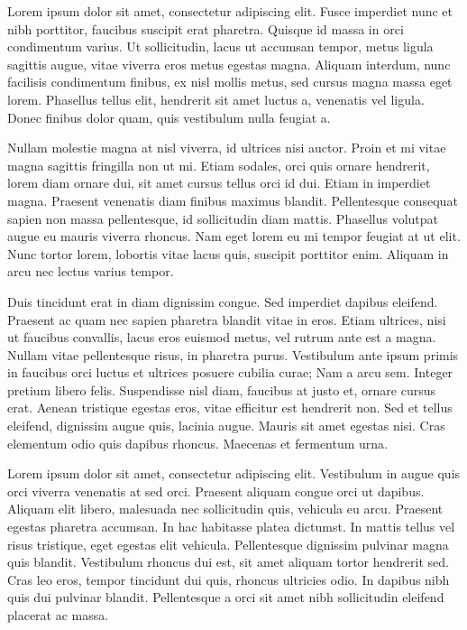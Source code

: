 \documentclass[onecolumn]{tome}
\begin{document}
Lorem ipsum dolor sit amet, consectetur adipiscing elit. Fusce imperdiet nunc et nibh porttitor, faucibus suscipit erat pharetra. Quisque id massa in orci condimentum varius. Ut sollicitudin, lacus ut accumsan tempor, metus ligula sagittis augue, vitae viverra eros metus egestas magna. Aliquam interdum, nunc facilisis condimentum finibus, ex nisl mollis metus, sed cursus magna massa eget lorem. Phasellus tellus elit, hendrerit sit amet luctus a, venenatis vel ligula. Donec finibus dolor quam, quis vestibulum nulla feugiat a.

Nullam molestie magna at nisl viverra, id ultrices nisi auctor. Proin et mi vitae magna sagittis fringilla non ut mi. Etiam sodales, orci quis ornare hendrerit, lorem diam ornare dui, sit amet cursus tellus orci id dui. Etiam in imperdiet magna. Praesent venenatis diam finibus maximus blandit. Pellentesque consequat sapien non massa pellentesque, id sollicitudin diam mattis. Phasellus volutpat augue eu mauris viverra rhoncus. Nam eget lorem eu mi tempor feugiat at ut elit. Nunc tortor lorem, lobortis vitae lacus quis, suscipit porttitor enim. Aliquam in arcu nec lectus varius tempor.

Duis tincidunt erat in diam dignissim congue. Sed imperdiet dapibus eleifend. Praesent ac quam nec sapien pharetra blandit vitae in eros. Etiam ultrices, nisi ut faucibus convallis, lacus eros euismod metus, vel rutrum ante est a magna. Nullam vitae pellentesque risus, in pharetra purus. Vestibulum ante ipsum primis in faucibus orci luctus et ultrices posuere cubilia curae; Nam a arcu sem. Integer pretium libero felis. Suspendisse nisl diam, faucibus at justo et, ornare cursus erat. Aenean tristique egestas eros, vitae efficitur est hendrerit non. Sed et tellus eleifend, dignissim augue quis, lacinia augue. Mauris sit amet egestas nisi. Cras elementum odio quis dapibus rhoncus. Maecenas et fermentum urna.

Lorem ipsum dolor sit amet, consectetur adipiscing elit. Vestibulum in augue quis orci viverra venenatis at sed orci. Praesent aliquam congue orci ut dapibus. Aliquam elit libero, malesuada nec sollicitudin quis, vehicula eu arcu. Praesent egestas pharetra accumsan. In hac habitasse platea dictumst. In mattis tellus vel risus tristique, eget egestas elit vehicula. Pellentesque dignissim pulvinar magna quis blandit. Vestibulum rhoncus dui est, sit amet aliquam tortor hendrerit sed. Cras leo eros, tempor tincidunt dui quis, rhoncus ultricies odio. In dapibus nibh quis dui pulvinar blandit. Pellentesque a orci sit amet nibh sollicitudin eleifend placerat ac massa.
\end{document}
